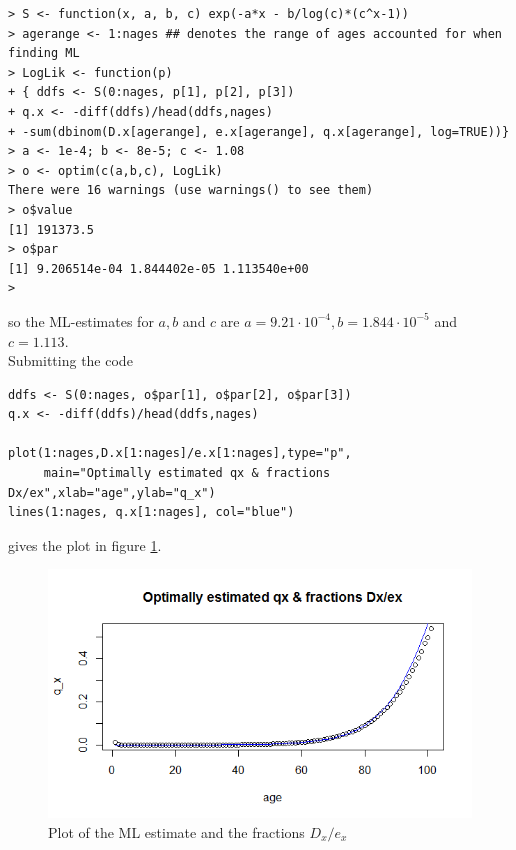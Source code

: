 \begin{verbatim}
> S <- function(x, a, b, c) exp(-a*x - b/log(c)*(c^x-1))
> agerange <- 1:nages ## denotes the range of ages accounted for when finding ML
> LogLik <- function(p)
+ { ddfs <- S(0:nages, p[1], p[2], p[3])
+ q.x <- -diff(ddfs)/head(ddfs,nages)
+ -sum(dbinom(D.x[agerange], e.x[agerange], q.x[agerange], log=TRUE))}
> a <- 1e-4; b <- 8e-5; c <- 1.08
> o <- optim(c(a,b,c), LogLik) 
There were 16 warnings (use warnings() to see them)
> o$value
[1] 191373.5
> o$par
[1] 9.206514e-04 1.844402e-05 1.113540e+00
>
\end{verbatim}
so the ML-estimates for $a, b$ and $c$ are $a = 9.21 \cdot 10^{-4}, b=1.844 \cdot 10^{-5}$ and $c = 1.113$. \\
Submitting the code
\begin{verbatim}
ddfs <- S(0:nages, o$par[1], o$par[2], o$par[3])
q.x <- -diff(ddfs)/head(ddfs,nages)

plot(1:nages,D.x[1:nages]/e.x[1:nages],type="p",
     main="Optimally estimated qx & fractions Dx/ex",xlab="age",ylab="q_x")
lines(1:nages, q.x[1:nages], col="blue")
\end{verbatim}
gives the plot in figure \ref{Figure_Question9_1}.
\begin{center}
\begin{figure}[H]

\includegraphics[scale=1]{Question_9_MakehamGompertz_1.png}

\caption{Plot of the ML estimate and the fractions $D_x/e_x$}
\label{Figure_Question9_1}

\end{figure}
\end{center}

